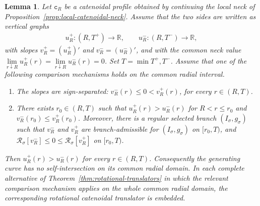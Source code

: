\documentclass{amsart}
\theoremstyle{plain}
\newtheorem{lemma}[theorem]{Lemma}
\theoremstyle{mainintrothm}
\theoremstyle{definition}
\begin{document}
\begin{lemma}
	\label{lem:embeddedness-from-slope-comparison}
	Let $\mathtt c_R$ be a catenoidal profile obtained by continuing the local
	neck of Proposition~\ref{prop:local-catenoidal-neck}.  Assume that the two
	sides are written as vertical graphs
	\begin{align*}
		u_R^+:(R,T^+)\to\mathbb R,
		\qquad
		u_R^-:(R,T^-)\to\mathbb R,
	\end{align*}
	with slopes $v_R^+=(u_R^+)'$ and $v_R^-=(u_R^-)'$, and with the common neck
	value $\lim\limits_{r\downarrow R}u_R^+(r)=\lim\limits_{r\downarrow R}u_R^-(r)=0$. Set $T=\min{T^+,T^-}$.  Assume that one of the following comparison mechanisms holds on the common radial interval.
	
	\begin{enumerate}[label=\textup{(\alph*)}]
		\item \label{emb:sign-separated}
		The slopes are sign-separated: $v_R^-(r)\le0<v_R^+(r)$, for every $r\in(R,T)$.
		
		\item \label{emb:ordered-branch}
		There exists $r_0\in(R,T)$ such that
		$u_R^+(r)>u_R^-(r)$ for $R<r\le r_0$ and
		$v_R^-(r_0)\le v_R^+(r_0)$.  Moreover, there is a regular selected branch
		$(I_\sigma,g_\sigma)$ such that $v_R^-$ and $v_R^+$ are branch-admissible
		for $(I_\sigma,g_\sigma)$ on $[r_0,T)$, and $\mathcal R_\sigma[v_R^-]\le0\le\mathcal R_\sigma[v_R^+]$ on $[r_0,T)$.
	\end{enumerate}
	Then $u_R^+(r)>u_R^-(r)$ for every $r\in(R,T)$. Consequently the generating curve has no self-intersection on its common
	radial domain.  In each complete alternative of
	Theorem~\ref{thm:rotational-translators} in which the relevant comparison
	mechanism applies on the whole common radial domain, the corresponding
	rotational catenoidal translator is embedded.	
\end{lemma}
\end{document}
